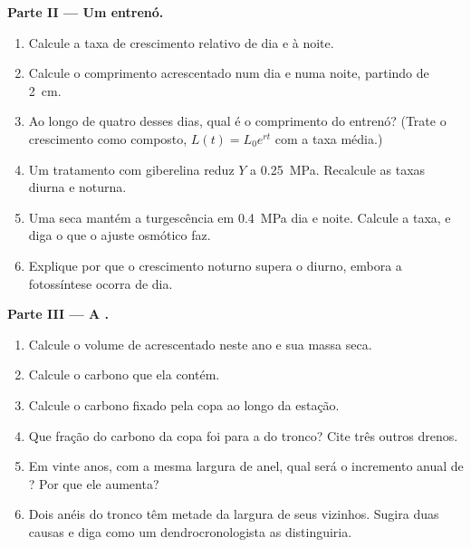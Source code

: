 \begin{problem}
\medskip
\noindent\textbf{Parte II --- Um entrenó.}
\begin{enumerate}[resume]
  \item Calcule a taxa de crescimento relativo de dia e à noite.
  \item Calcule o comprimento acrescentado num dia e numa noite,
        partindo de \qty{2}{cm}.
  \item Ao longo de quatro desses dias, qual é o comprimento do
        entrenó? (Trate o crescimento como composto, $L(t) = L_0 e^{rt}$
        com a taxa média.)
  \item Um tratamento com giberelina reduz $Y$ a \qty{0.25}{MPa}.
        Recalcule as taxas diurna e noturna.
  \item Uma seca mantém a turgescência em \qty{0.4}{MPa} dia e noite.
        Calcule a taxa, e diga o que o ajuste osmótico faz.
  \item Explique por que o crescimento noturno supera o diurno, embora
        a fotossíntese ocorra de dia.
\end{enumerate}

\medskip
\noindent\textbf{Parte III --- A .}
\begin{enumerate}[resume]
  \item Calcule o volume de  acrescentado neste ano e sua massa
        seca.
  \item Calcule o carbono que ela contém.
  \item Calcule o carbono fixado pela copa ao longo da estação.
  \item Que fração do carbono da copa foi para a  do tronco? Cite
        três outros drenos.
  \item Em vinte anos, com a mesma largura de anel, qual será o
        incremento anual de ? Por que ele aumenta?
  \item Dois anéis do tronco têm metade da largura de seus vizinhos.
        Sugira duas causas e diga como um dendrocronologista as
        distinguiria.
\end{enumerate}


\end{problem}
